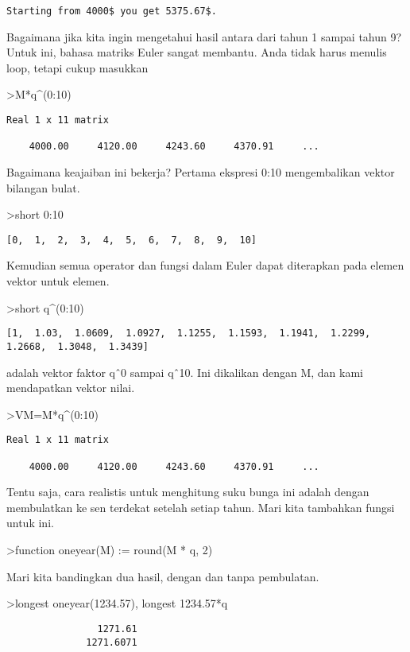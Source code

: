 \documentclass[
]{book}
\begin{document}
\begin{verbatim}
Starting from 4000$ you get 5375.67$.
\end{verbatim}

Bagaimana jika kita ingin mengetahui hasil antara dari tahun 1 sampai tahun 9? Untuk ini, bahasa matriks Euler sangat membantu. Anda tidak harus menulis loop, tetapi cukup masukkan

\textgreater M*q\^{}(0:10)

\begin{verbatim}
Real 1 x 11 matrix

    4000.00     4120.00     4243.60     4370.91     ...
\end{verbatim}

Bagaimana keajaiban ini bekerja? Pertama ekspresi 0:10 mengembalikan vektor bilangan bulat.

\textgreater short 0:10

\begin{verbatim}
[0,  1,  2,  3,  4,  5,  6,  7,  8,  9,  10]
\end{verbatim}

Kemudian semua operator dan fungsi dalam Euler dapat diterapkan pada elemen vektor untuk elemen.

\textgreater short q\^{}(0:10)

\begin{verbatim}
[1,  1.03,  1.0609,  1.0927,  1.1255,  1.1593,  1.1941,  1.2299,
1.2668,  1.3048,  1.3439]
\end{verbatim}

adalah vektor faktor qˆ0 sampai qˆ10. Ini dikalikan dengan M, dan kami mendapatkan vektor nilai.

\textgreater VM=M*q\^{}(0:10)

\begin{verbatim}
Real 1 x 11 matrix

    4000.00     4120.00     4243.60     4370.91     ...
\end{verbatim}

Tentu saja, cara realistis untuk menghitung suku bunga ini adalah dengan membulatkan ke sen terdekat setelah setiap tahun. Mari kita tambahkan fungsi untuk ini.

\textgreater function oneyear(M) := round(M * q, 2)

Mari kita bandingkan dua hasil, dengan dan tanpa pembulatan.

\textgreater longest oneyear(1234.57), longest 1234.57*q

\begin{verbatim}
                1271.61 
              1271.6071 
\end{verbatim}
\end{document}
